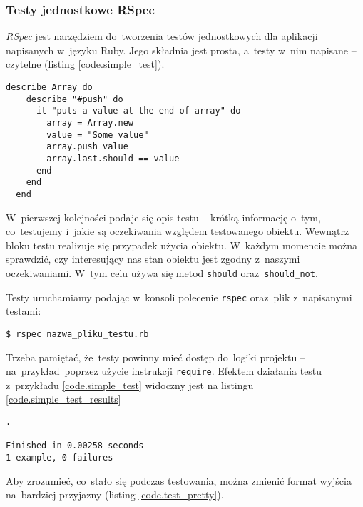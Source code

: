 \subsubsection{Testy jednostkowe RSpec} \label{dokumentacja.rspec}

\textit{RSpec} \cite{rspec} jest narzędziem do~tworzenia testów jednostkowych dla aplikacji napisanych w~języku Ruby. Jego składnia jest prosta, a~testy w~nim napisane -- czytelne (listing \ref{code.simple_test}).

  \begin{lstlisting}[label={code.simple_test}]
  describe Array do
    describe "#push" do
      it "puts a value at the end of array" do
        array = Array.new
        value = "Some value"
        array.push value
        array.last.should == value
      end
    end
  end
  \end{lstlisting}

W~pierwszej kolejności podaje się opis testu -- krótką informację o~tym, co~testujemy i~jakie są oczekiwania względem testowanego obiektu. Wewnątrz bloku testu realizuje się przypadek użycia obiektu. W~każdym momencie można sprawdzić, czy interesujący nas stan obiektu jest zgodny z~naszymi oczekiwaniami. W~tym celu używa się metod \texttt{should} oraz~\texttt{should\_not}.


Testy uruchamiamy podając w~konsoli polecenie \texttt{rspec} oraz~plik z~napisanymi testami:

\mbox{\texttt{\$ rspec nazwa\_pliku\_testu.rb}}

Trzeba pamiętać, że~testy powinny mieć dostęp do~logiki projektu -- na~przykład~poprzez użycie instrukcji \texttt{require}. Efektem działania testu z~przykładu \ref{code.simple_test} widoczny jest na listingu \ref{code.simple_test_results}

\begin{lstlisting}[label={code.simple_test_results}]
.

Finished in 0.00258 seconds
1 example, 0 failures
\end{lstlisting}

Aby zrozumieć, co~stało się podczas testowania, można zmienić format wyjścia na~bardziej przyjazny (listing \ref{code.test_pretty}).


